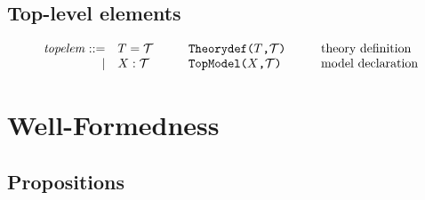 \documentclass[12pt]{article}
\newcommand{\X}{X} %
\newcommand{\T}{\ensuremath{\mathcal T}}
\renewcommand{\t}{T}
\begin{document}
\subsection{Top-level elements}

\[
\begin{array}{rl@{\hspace{1cm}}l@{\hspace{1cm}}l}
\mathit{topelem} ::= & \t = \T & \texttt{Theorydef($\t$,$\T$)} & \mbox{theory definition}\\
|&\X : \T& \texttt{TopModel($\X$,$\T$)}&\mbox{model declaration}\\
\end{array}
\]
\section{Well-Formedness}

\subsection{Propositions}

\newcommand{\G}{\Gamma}
\newcommand{\wf}[3]{#1 \vdash #2 : #3}
\newcommand{\st}[3]{#1 \vdash #2 \leq #3}
\newcommand{\kpt}{\mathsf{PropType}}
\newcommand{\eqv}[4]{#1 \vdash #2 = #3 : #4}
\end{document}
